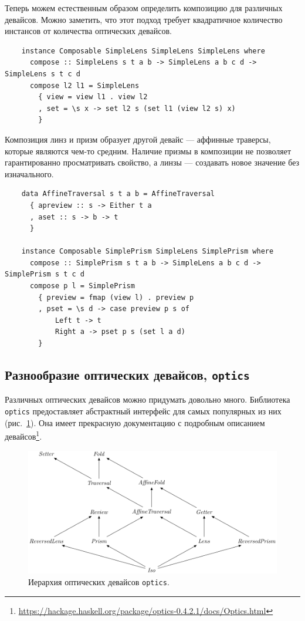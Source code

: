 Теперь можем естественным образом определить композицию для различных девайсов.
Можно заметить, что этот подход требует квадратичное количество инстансов от количества оптических девайсов.

\begin{verbatim}
    instance Composable SimpleLens SimpleLens SimpleLens where
      compose :: SimpleLens s t a b -> SimpleLens a b c d -> SimpleLens s t c d
      compose l2 l1 = SimpleLens
        { view = view l1 . view l2
        , set = \s x -> set l2 s (set l1 (view l2 s) x)
        }
\end{verbatim}

Композиция линз и призм образует другой девайс --- аффинные траверсы, которые являются чем-то средним.
Наличие призмы в композиции не позволяет гарантированно просматривать свойство, а линзы --- создавать новое значение без изначального.
\begin{verbatim}
    data AffineTraversal s t a b = AffineTraversal
      { apreview :: s -> Either t a
      , aset :: s -> b -> t
      }

    instance Composable SimplePrism SimpleLens SimplePrism where
      compose :: SimplePrism s t a b -> SimpleLens a b c d -> SimplePrism s t c d
      compose p l = SimplePrism
        { preview = fmap (view l) . preview p
        , pset = \s d -> case preview p s of
            Left t -> t
            Right a -> pset p s (set l a d)
        }
\end{verbatim}


\subsection{Разнообразие оптических девайсов, \texttt{optics}} \label{subsec:optics}

Различных оптических девайсов можно придумать довольно много.
Библиотека \texttt{optics} предоставляет абстрактный интерфейс для самых популярных из них (рис.~\ref{fig:optics-hierarchy}).
Она имеет прекрасную документацию с подробным описанием девайсов\footnote{\url{https://hackage.haskell.org/package/optics-0.4.2.1/docs/Optics.html}}.

\begin{figure}
    \centering
    \includegraphics[width=\textwidth]{figs/optics-hierarchy}
    \caption{Иерархия оптических девайсов \texttt{optics}.}
    \label{fig:optics-hierarchy}
\end{figure}

